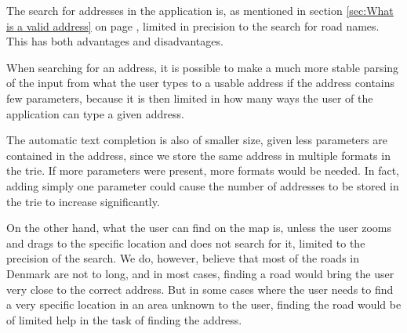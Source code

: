 The search for addresses in the application is, as mentioned in section \ref{sec:What is a valid address} on page \pageref{sec:What is a valid address}, limited in precision to the search for road names. This has both advantages and disadvantages.

When searching for an address, it is possible to make a much more stable parsing of the input from what the user types to a usable address if the address contains few parameters, because it is then limited in how many ways the user of the application can type a given address.

The automatic text completion is also of smaller size, given less parameters are contained in the address, since we store the same address in multiple formats in the trie. If more parameters were present, more formats would be needed. In fact, adding simply one parameter could cause the number of addresses to be stored in the trie to increase significantly.

On the other hand, what the user can find on the map is, unless the user zooms and drags to the specific location and does not search for it, limited to the precision of the search. We do, however, believe that most of the roads in Denmark are not to long, and in most cases, finding a road would bring the user very close to the correct address. But in some cases where the user needs to find a very specific location in an area unknown to the user, finding the road would be of limited help in the task of finding the address.
